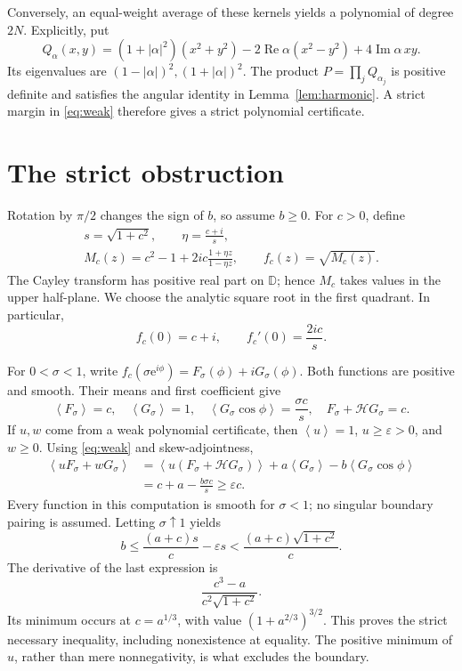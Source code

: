 \documentclass[11pt]{article}
\theoremstyle{remark}\newtheorem{remark}[theorem]{Remark}
\newcommand{\D}{\mathbb D}
\newcommand{\Rea}{\operatorname{Re}}
\newcommand{\Ima}{\operatorname{Im}}
\newcommand{\avg}[1]{\left\langle #1\right\rangle}
\newcommand{\ee}{\mathrm e}
\begin{document}
Conversely, an equal-weight average of these kernels yields a
polynomial of degree \(2N\). Explicitly, put
\begin{equation}\label{eq:quadratic}
 Q_\alpha(x,y)=(1+|\alpha|^2)(x^2+y^2)
       -2\Rea\alpha(x^2-y^2)+4\Ima\alpha\,xy.
\end{equation}
Its eigenvalues are \((1-|\alpha|)^2,(1+|\alpha|)^2\).
The product \(P=\prod_jQ_{\alpha_j}\) is positive definite and
satisfies the angular identity in Lemma~\ref{lem:harmonic}.
A strict margin in \eqref{eq:weak} therefore gives a strict
polynomial certificate.

\section{The strict obstruction}
Rotation by \(\pi/2\) changes the sign of \(b\), so assume \(b\ge0\).
For \(c>0\), define
\begin{equation}\label{eq:test}
 \begin{gathered}
 s=\sqrt{1+c^2},\qquad \eta=\frac{c+i}{s},\\
 M_c(z)=c^2-1+2ic\frac{1+\eta z}{1-\eta z},
 \qquad f_c(z)=\sqrt{M_c(z)}.
 \end{gathered}
\end{equation}
The Cayley transform has positive real part on \(\D\); hence
\(M_c\) takes values in the upper half-plane. We choose the
analytic square root in the first quadrant. In particular,
\begin{equation}\label{eq:fcoeff}
 f_c(0)=c+i,\qquad f_c'(0)=\frac{2ic}{s}.
\end{equation}

For \(0<\sigma<1\), write
\(f_c(\sigma\ee^{i\phi})=F_\sigma(\phi)+iG_\sigma(\phi)\).
Both functions are positive and smooth. Their means and first
coefficient give
\begin{equation}\label{eq:testmeans}
 \avg{F_\sigma}=c,\quad \avg{G_\sigma}=1,\quad
 \avg{G_\sigma\cos\phi}=\frac{\sigma c}{s},\quad
 F_\sigma+\mathcal HG_\sigma=c.
\end{equation}
If \(u,w\) come from a weak polynomial certificate, then
\(\avg u=1\), \(u\ge\varepsilon>0\), and \(w\ge0\).
Using \eqref{eq:weak} and skew-adjointness,
\begin{align}
 \avg{uF_\sigma+wG_\sigma}
 &=\avg{u(F_\sigma+\mathcal HG_\sigma)}
      +a\avg{G_\sigma}-b\avg{G_\sigma\cos\phi}\nonumber\\
 &=c+a-\frac{b\sigma c}{s}\ge\varepsilon c.
 \label{eq:pairing}
\end{align}
Every function in this computation is smooth for \(\sigma<1\);
no singular boundary pairing is assumed.
Letting \(\sigma\uparrow1\) yields
\begin{equation}\label{eq:dual}
 b\le\frac{(a+c)s}{c}-\varepsilon s
      <\frac{(a+c)\sqrt{1+c^2}}c.
\end{equation}
The derivative of the last expression is
\[
 \frac{c^3-a}{c^2\sqrt{1+c^2}}.
\]
Its minimum occurs at \(c=a^{1/3}\), with value
\((1+a^{2/3})^{3/2}\). This proves the strict necessary
inequality, including nonexistence at equality. The positive
minimum of \(u\), rather than mere nonnegativity, is what
excludes the boundary.
\end{document}
